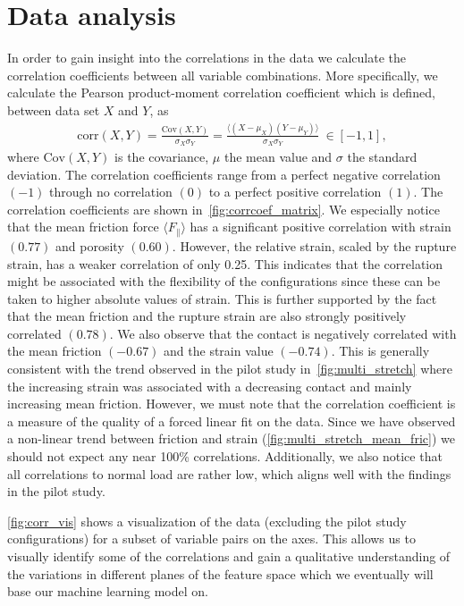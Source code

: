\section{Data analysis}\label{sec:data_analysis}
In order to gain insight into the correlations in the data we calculate the correlation coefficients between all variable combinations. More specifically, we calculate the Pearson product-moment correlation coefficient which is defined, between data set $X$ and $Y$, as
\begin{align}
  \mathrm{corr}(X,Y) = \frac{\mathrm{Cov}(X,Y)}{\sigma_X \sigma_Y} = \frac{\langle (X - \mu_X)(Y - \mu_Y)\rangle}{\sigma_X \sigma_Y} \ \in [-1, 1],
  \label{eq:pearson}
\end{align}
where $\mathrm{Cov}(X,Y)$ is the covariance, $\mu$ the mean value and $\sigma$ the standard deviation. The correlation coefficients range from a perfect negative correlation $(-1)$ through no correlation $(0)$ to a perfect positive correlation $(1)$. The correlation coefficients are shown in~\cref{fig:corrcoef_matrix}. We especially notice that the mean friction
force $\langle F_{\parallel} \rangle$ has a significant positive correlation
with strain $(0.77)$ and porosity $(0.60)$. However, the relative strain, scaled by the rupture strain, has a weaker correlation of only 0.25.
This indicates that the correlation might be associated with the flexibility of
the configurations since these can be taken to higher absolute values of strain.
This is further supported by the fact that the mean friction and the rupture
strain are also strongly positively correlated $(0.78)$. We also observe that the contact is negatively
correlated with the mean friction $(-0.67)$ and the strain value $(-0.74)$. This is generally consistent with the trend observed in the pilot study in~\cref{fig:multi_stretch} where the increasing strain was associated with a decreasing contact and mainly increasing mean friction. However, we must note that the correlation coefficient is a measure of the quality of a forced linear fit on the data. Since we have observed a non-linear trend between friction and strain (\cref{fig:multi_stretch_mean_fric}) we should not expect any near 100\% correlations. Additionally, we also notice that all correlations to normal load are rather low, which aligns well with the findings in the pilot study. 

\cref{fig:corr_vis} shows a visualization of the data (excluding
the pilot study configurations) for a subset of variable pairs on the axes. This allows us to visually identify some of the correlations and gain a qualitative understanding of the variations in different planes of the feature space which we eventually will base our machine learning model on. 

